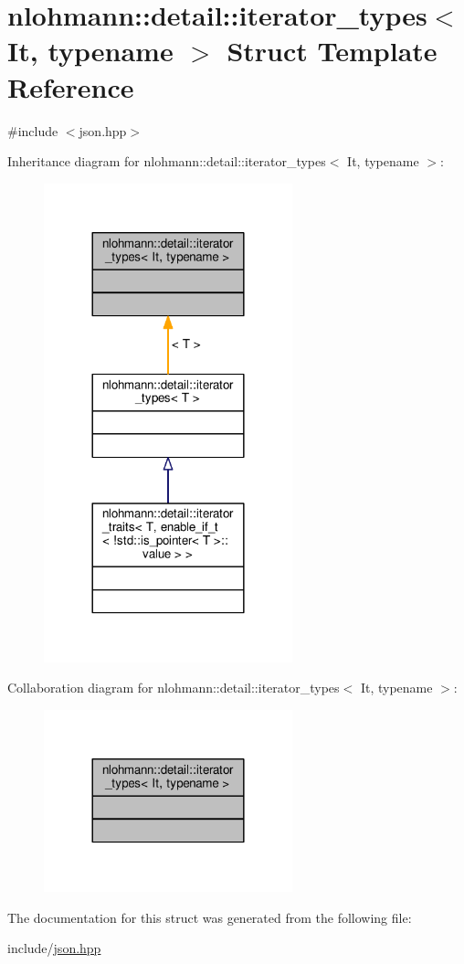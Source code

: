 \hypertarget{structnlohmann_1_1detail_1_1iterator__types}{}\section{nlohmann\+:\+:detail\+:\+:iterator\+\_\+types$<$ It, typename $>$ Struct Template Reference}
\label{structnlohmann_1_1detail_1_1iterator__types}


{\ttfamily \#include $<$json.\+hpp$>$}



Inheritance diagram for nlohmann\+:\+:detail\+:\+:iterator\+\_\+types$<$ It, typename $>$\+:
\nopagebreak
\begin{figure}[H]
\begin{center}
\leavevmode
\includegraphics[width=204pt]{structnlohmann_1_1detail_1_1iterator__types__inherit__graph}
\end{center}
\end{figure}


Collaboration diagram for nlohmann\+:\+:detail\+:\+:iterator\+\_\+types$<$ It, typename $>$\+:
\nopagebreak
\begin{figure}[H]
\begin{center}
\leavevmode
\includegraphics[width=204pt]{structnlohmann_1_1detail_1_1iterator__types__coll__graph}
\end{center}
\end{figure}


The documentation for this struct was generated from the following file\+:\begin{DoxyCompactItemize}
\item 
include/\hyperlink{json_8hpp}{json.\+hpp}\end{DoxyCompactItemize}
